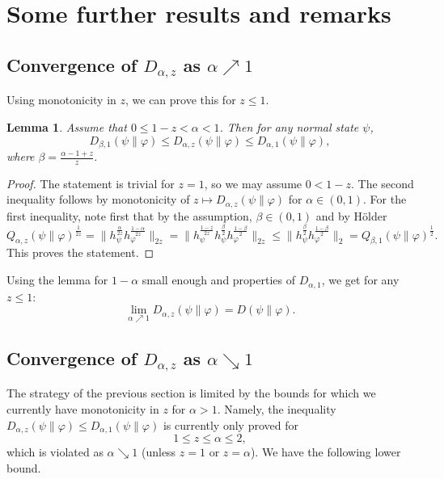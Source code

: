 \documentclass[12pt]{article}
\newtheorem{lemma}{Lemma}
\theoremstyle{definition}
\theoremstyle{remark}
\begin{document}
\section{Some further results and remarks}


\subsection{Convergence of $D_{\alpha,z}$ as $\alpha\nearrow 1$}

Using monotonicity in $z$, we can prove this for $z\le 1$.

\begin{lemma}\label{lemma:ineq2} Assume that $0\le 1-z<\alpha<1$. Then for any normal
state $\psi$,
\[
D_{\beta,1}(\psi\|\varphi)\le D_{\alpha,z}(\psi\|\varphi)\le D_{\alpha,1}(\psi\|\varphi),
\]
where $\beta=\frac{\alpha-1+z}z$.


\end{lemma}

\begin{proof} The statement is trivial for $z=1$, so we may assume $0<1-z$. 
The second inequality follows by monotonicity of $z\mapsto
D_{\alpha,z}(\psi\|\varphi)$ for $\alpha\in (0,1)$. For the first inequality, note first  that by
the assumption,  $\beta\in (0,1)$ and by H\"older 
\[
Q_{\alpha,z}(\psi\|\varphi)^{\frac1{2z}}=\|h_\psi^{\frac{\alpha}{2z}}h_\varphi^{\frac{1-\alpha}{2z}}\|_{2z}=
\|h_{\psi}^{\frac{1-z}{2z}}h_{\psi}^{\frac{\beta}2}h_\varphi^{\frac{1-\beta}2}\|_{2z}\le
\|h_\psi^{\frac{\beta}2}h_{\varphi}^{\frac{1-\beta}2}\|_2=Q_{\beta,1}(\psi\|\varphi)^{\frac12}.
\]
This proves the statement.

\end{proof}

Using the lemma for $1-\alpha$ small enough and properties of $D_{\alpha,1}$, we get for any $z\le 1$:
\[
\lim_{\alpha\nearrow 1} D_{\alpha,z}(\psi\|\varphi)=D(\psi\|\varphi).
\]



\subsection{Convergence of $D_{\alpha,z}$ as $\alpha\searrow 1$}\label{subsection:se}


The strategy of the previous section is limited by the bounds for which we currently have
monotonicity in $z$ for $\alpha>1$. Namely, the inequality $D_{\alpha,z}(\psi\|\varphi)\le
D_{\alpha,1}(\psi\|\varphi)$ is currently only proved for 
\[
1\le z\le \alpha\le 2,
\]
which is violated as $\alpha\searrow 1$ (unless $z=1$ or $z=\alpha$). We have the
following lower bound.
\end{document}
